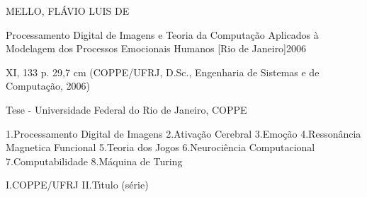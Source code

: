 \newlength{\quarentatt}
\settowidth{\quarentatt}{\ttfamily aaaaaaaaaaaaaaaaaaaaaaaaaaaaaaaaaaaaaaaa}
\newlength{\tabulacao}
\setlength{\tabulacao}{.43cm}
\vspace*{\fill}
{
        \ttfamily
        \begin{center}
                \parbox{\quarentatt}
                {
                        \noindent
MELLO, FLÁVIO LUIS DE

                        \hspace{\tabulacao}
Processamento Digital de Imagens e Teoria da Computação Aplicados à Modelagem dos Processos Emocionais Humanos [Rio de Janeiro]2006

                        \hspace{\tabulacao}
XI, 133 p. 29,7 cm (COPPE/UFRJ, D.Sc., Engenharia de Sistemas e de Computação, 2006)

                        \hspace{\tabulacao}
Tese - Uni\-ver\-si\-da\-de Fe\-de\-ral do Rio de Ja\-nei\-ro, COPPE

                         
1.Processamento Digital de Imagens
2.Ativação Cerebral
3.Emoção
4.Ressonância Magnetica Funcional
5.Teoria dos Jogos
6.Neurociência Computacional
7.Computabilidade
8.Máquina de Turing


                        \hspace{\tabulacao}
I.COPPE/UFRJ
                        \hspace{\tabulacao}
II.T\'{\i}tulo (s\'erie)
                }
        \end{center}
}
\vspace*{\fill}
\pagebreak
